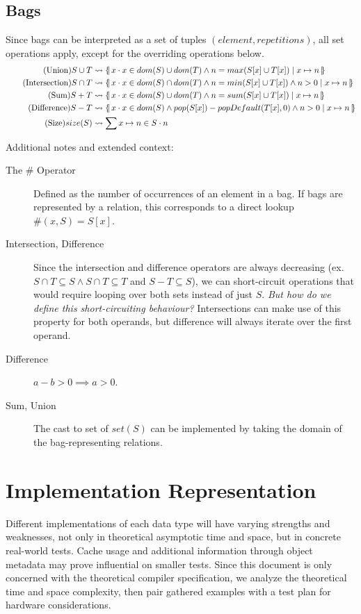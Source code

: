 \documentclass{article}
\newcommand{\lbbar}{\{\kern-0.5ex|}
\newcommand{\rbbar}{|\kern-0.5ex\}}
\newcommand{\bag}[3]{%
  \lbbar \, #1 \cdot #2 \mid #3 \, \rbbar%
}
\begin{document}
\subsection{Bags}
Since bags can be interpreted as a set of tuples $(element, repetitions)$, all set operations apply, except for the overriding operations below.
\begin{align}
  \tag{Union}
  S \cup T &\leadsto \bag{x}{x \in dom(S) \cup dom(T) \land n = max(S[x] \cup T[x])}{x \mapsto n}
  \\
  \tag{Intersection}
  S \cap T &\leadsto \bag{x}{x \in dom(S) \cap dom(T) \land n = min(S[x] \cup T[x]) \land n > 0}{x \mapsto n}
  \\
  \tag{Sum}
  S + T &\leadsto \bag{x}{x \in dom(S) \cup dom(T) \land n = sum(S[x] \cup T[x])}{x \mapsto n}
  \\
  \tag{Difference}
  S - T &\leadsto \bag{x}{x \in dom(S) \land pop(S[x]) - popDefault(T[x], 0) \land n > 0}{x \mapsto n}
  \\
  \tag{Size}
  size(S) &\leadsto \sum x \mapsto n \in S \cdot n
\end{align}

Additional notes and extended context:
\begin{description}
  \item[The $\#$ Operator] Defined as the number of occurrences of an element in a bag. If bags are represented by a relation, this corresponds to a direct lookup $\#(x, S) = S[x]$.
  \item[Intersection, Difference] Since the intersection and difference operators are always decreasing (ex. $S \cap T \subseteq S \land S \cap T \subseteq T$ and $S - T \subseteq S$), we can short-circuit operations that would require looping over both sets instead of just $S$. \textit{But how do we define this short-circuiting behaviour?} Intersections can make use of this property for both operands, but difference will always iterate over the first operand.
  \item[Difference] $a-b > 0 \implies a > 0$.
  \item[Sum, Union] The cast to set of $set(S)$ can be implemented by taking the domain of the bag-representing relations.
\end{description}

\section{Implementation Representation}
Different implementations of each data type will have varying strengths and weaknesses, not only in theoretical asymptotic time and space, but in concrete real-world tests. Cache usage and additional information through object metadata may prove influential on smaller tests. Since this document is only concerned with the theoretical compiler specification, we analyze the theoretical time and space complexity, then pair gathered examples with a test plan for hardware considerations.
\end{document}
